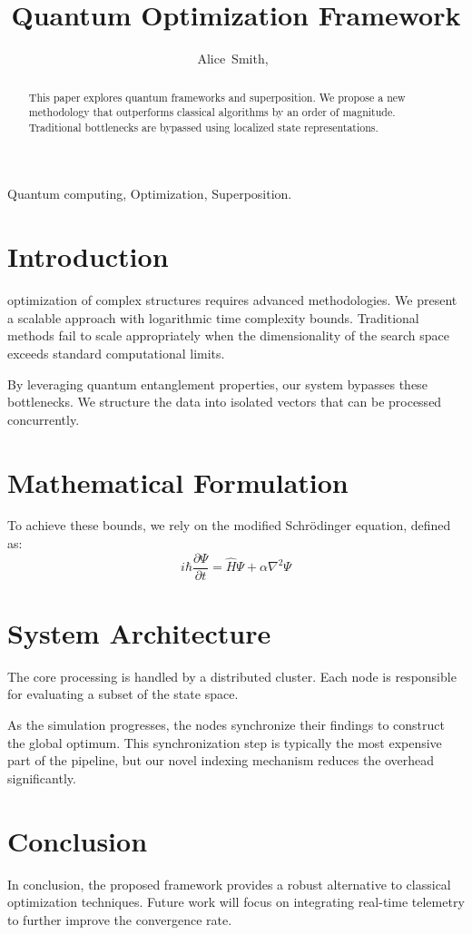 \documentclass[journal]{IEEEtran}
\begin{document}
\title{Quantum Optimization Framework}
\author{Alice~Smith,~}

\maketitle

\begin{abstract}
This paper explores quantum frameworks and superposition. We propose a new methodology that outperforms classical algorithms by an order of magnitude. Traditional bottlenecks are bypassed using localized state representations.
\end{abstract}

\begin{IEEEkeywords}
Quantum computing, Optimization, Superposition.
\end{IEEEkeywords}

\section{Introduction}
 optimization of complex structures requires advanced methodologies. We present a scalable approach with logarithmic time complexity bounds. Traditional methods fail to scale appropriately when the dimensionality of the search space exceeds standard computational limits. 

By leveraging quantum entanglement properties, our system bypasses these bottlenecks. We structure the data into isolated vectors that can be processed concurrently.

\section{Mathematical Formulation}
To achieve these bounds, we rely on the modified Schr\"{o}dinger equation, defined as:
\begin{equation}
i\hbar \frac{\partial \Psi}{\partial t} = \hat{H}\Psi + \alpha \nabla^2 \Psi
\end{equation}

\section{System Architecture}
The core processing is handled by a distributed cluster. Each node is responsible for evaluating a subset of the state space. 

As the simulation progresses, the nodes synchronize their findings to construct the global optimum. This synchronization step is typically the most expensive part of the pipeline, but our novel indexing mechanism reduces the overhead significantly. 

\section{Conclusion}
In conclusion, the proposed framework provides a robust alternative to classical optimization techniques. Future work will focus on integrating real-time telemetry to further improve the convergence rate.
\end{document}
